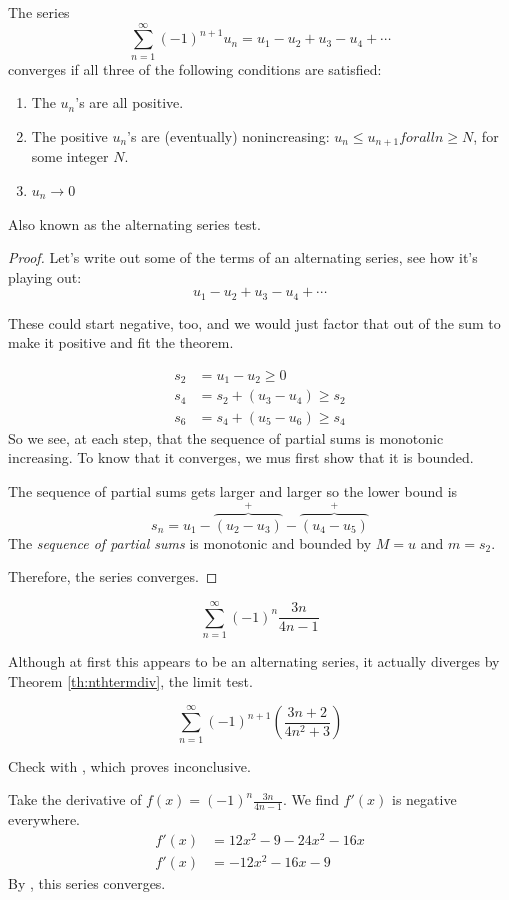 \begin{theorem}\label{th:alternatingseries}\cite[p.~568]{thomas}
  The series
  \[ \sum^\infty_{n=1} (-1)^{n+1} u_n = u_1 - u_2 + u_3 - u_4 + \cdots \]
  converges if all three of the following conditions are satisfied:
  \begin{enumerate}
    \item The $u_n$'s are all positive.
    \item The positive $u_n$'s are (eventually) nonincreasing: $u_n \leq u_{n+1}
      for all n \geq N$, for some integer $N$.
    \item $u_n \to 0$
  \end{enumerate}
  \begin{note}
    Also known as the alternating series test.
  \end{note}
\end{theorem}
\begin{proof}
  Let's write out some of the terms of an alternating series, see how it's
  playing out:
  \[ u_1 - u_2 + u_3 - u_4 + \cdots\]
  \begin{remark}
    These could start negative, too, and we would just factor that out of the sum
    to make it positive and fit the theorem.
  \end{remark}
  \begin{align*}
    s_2 &= u_1 - u_2 \geq 0 \\
    s_4 &= s_2 + (u_3 - u_4) \geq s_2 \\
    s_6 &= s_4 + (u_5 - u_6) \geq s_4
  \end{align*}
  So we see, at each step, that the sequence of partial sums is monotonic
  increasing. To know that it converges, we mus first show that it is bounded.

  The sequence of partial sums gets larger and larger so the lower bound is
  \[ s_n = u_1 - \overbrace{(u_2 - u_3)}^+ - \overbrace{(u_4 - u_5)}^+ \]
  The \emph{sequence of partial sums} is monotonic and bounded by $M=u$ and
  $m=s_2$.

  Therefore, the series converges.
\end{proof}
\begin{ex}
  \[ \sum^\infty_{n=1} (-1)^n \frac{3n}{4n-1} \]

  Although at first this appears to be an alternating series, it actually
  diverges by Theorem \ref{th:nthtermdiv}, the limit test.
\end{ex}
\begin{ex}
  \[ \sum^\infty_{n=1} (-1)^{n+1} \left( \frac{3n+2}{4n^2+3} \right) \]
  \begin{sol}
    Check with , which proves inconclusive.

    Take the derivative of $f(x)=(-1)^n \frac{3n}{4n-1}$. We find $f'(x)$ is
    negative everywhere.
    \begin{align*}
      f'(x)&=12x^2-9-24x^2-16x \\
      f'(x)&=-12x^2-16x-9
    \end{align*}
    By , this series converges.
  \end{sol}
\end{ex}

